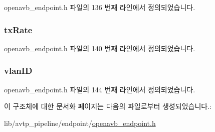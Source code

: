 openavb\+\_\+endpoint.\+h 파일의 136 번째 라인에서 정의되었습니다.

\subsubsection[{\texorpdfstring{tx\+Rate}{txRate}}]{ tx\+Rate}\hypertarget{structclient_stream__t_a348c4c50e96126b5b29920234ecae1e5}{}\label{structclient_stream__t_a348c4c50e96126b5b29920234ecae1e5}


openavb\+\_\+endpoint.\+h 파일의 140 번째 라인에서 정의되었습니다.

\subsubsection[{\texorpdfstring{vlan\+ID}{vlanID}}]{ vlan\+ID}\hypertarget{structclient_stream__t_a6f9e150f3345cb797072070d8972aec8}{}\label{structclient_stream__t_a6f9e150f3345cb797072070d8972aec8}


openavb\+\_\+endpoint.\+h 파일의 144 번째 라인에서 정의되었습니다.



이 구조체에 대한 문서화 페이지는 다음의 파일로부터 생성되었습니다.\+:\begin{DoxyCompactItemize}
\item 
lib/avtp\+\_\+pipeline/endpoint/\hyperlink{openavb__endpoint_8h}{openavb\+\_\+endpoint.\+h}\end{DoxyCompactItemize}
